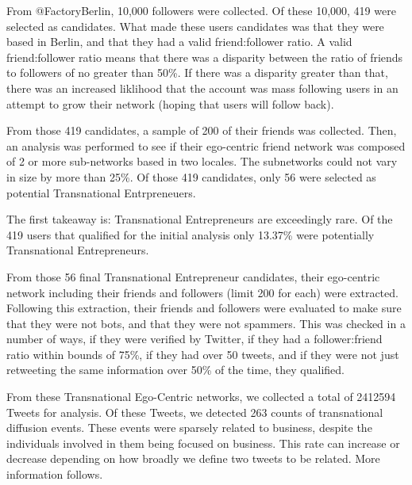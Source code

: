 From @FactoryBerlin, 10,000 followers were collected. Of these 10,000,
419 were selected as candidates. What made these users candidates was
that they were based in Berlin, and that they had a valid
friend:follower ratio. A valid friend:follower ratio means that there
was a disparity between the ratio of friends to followers of no
greater than 50\%. If there was a disparity greater than that, there
was an increased liklihood that the account was mass following users
in an attempt to grow their network (hoping that users will follow
back).

From those 419 candidates, a sample of 200 of their friends was
collected. Then, an analysis was performed to see if their ego-centric
friend network was composed of 2 or more sub-networks based in two
locales.  The subnetworks could not vary in size by more than 25\%. Of
those 419 candidates, only 56 were selected as potential Transnational
Entrpreneuers.

The first takeaway is: Transnational Entrepreneurs are exceedingly
rare. Of the 419 users that qualified for the initial analysis only
13.37\% were potentially Transnational Entrepreneurs.

From those 56 final Transnational Entrepreneur candidates, their
ego-centric network including their friends and followers (limit 200
for each) were extracted. Following this extraction, their friends and
followers were evaluated to make sure that they were not bots, and that
they were not spammers. This was checked in a number of ways, if they
were verified by Twitter, if they had a follower:friend ratio within
bounds of 75\%, if they had over 50 tweets, and if they were not just
retweeting the same information over 50\% of the time, they qualified.

From these Transnational Ego-Centric networks, we collected a total of
2412594 Tweets for analysis. Of these Tweets, we detected 263 counts
of transnational diffusion events. These events were sparsely related
to business, despite the individuals involved in them being focused on
business. This rate can increase or decrease depending on how broadly
we define two tweets to be related. More information follows.

